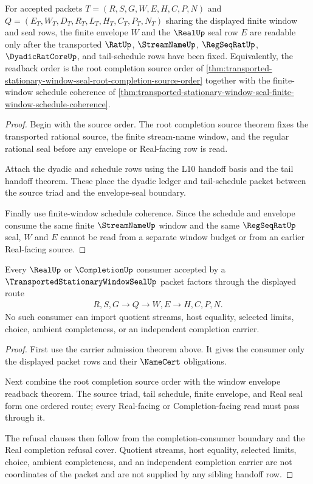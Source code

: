 \begin{theorem}
\label{thm:transported-stationary-window-seal-window-envelope-readback}
For accepted packets $T=(R,S,G,W,E,H,C,P,N)$ and $Q=(E_T,W_T,D_T,R_T,L_T,H_T,C_T,P_T,N_T)$ sharing the displayed finite window and seal rows, the finite envelope $W$ and the $\RealUp$ seal row $E$ are readable only after the transported $\RatUp$, $\StreamNameUp$, $\RegSeqRatUp$, $\DyadicRatCoreUp$, and tail-schedule rows have been fixed. Equivalently, the readback order is the root completion source order of \autoref{thm:transported-stationary-window-seal-root-completion-source-order} together with the finite-window schedule coherence of \autoref{thm:transported-stationary-window-seal-finite-window-schedule-coherence}.
\end{theorem}
\begin{proof}
Begin with the source order. The root completion source theorem fixes the transported rational source, the finite stream-name window, and the regular rational seal before any envelope or Real-facing row is read.

Attach the dyadic and schedule rows using the L10 handoff basis and the tail handoff theorem. These place the dyadic ledger and tail-schedule packet between the source triad and the envelope-seal boundary.

Finally use finite-window schedule coherence. Since the schedule and envelope consume the same finite $\StreamNameUp$ window and the same $\RegSeqRatUp$ seal, $W$ and $E$ cannot be read from a separate window budget or from an earlier Real-facing source.
\end{proof}

\begin{theorem}
\label{thm:transported-stationary-window-seal-completion-consumer-exhaustion}
Every $\RealUp$ or $\CompletionUp$ consumer accepted by a $\TransportedStationaryWindowSealUp$ packet factors through the displayed route
$$
\begin{aligned}
  R,S,G
  \longrightarrow
  Q
  \longrightarrow
  W,E
  \longrightarrow
  H,C,P,N .
\end{aligned}
$$
No such consumer can import quotient streams, host equality, selected limits, choice, ambient completeness, or an independent completion carrier.
\end{theorem}
\begin{proof}
First use the carrier admission theorem above. It gives the consumer only the displayed packet rows and their $\NameCert$ obligations.

Next combine the root completion source order with the window envelope readback theorem. The source triad, tail schedule, finite envelope, and Real seal form one ordered route; every Real-facing or Completion-facing read must pass through it.

The refusal clauses then follow from the completion-consumer boundary and the Real completion refusal cover. Quotient streams, host equality, selected limits, choice, ambient completeness, and an independent completion carrier are not coordinates of the packet and are not supplied by any sibling handoff row.
\end{proof}
